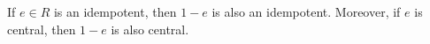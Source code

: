 If $e \in R$ is an idempotent, then $1 - e$ is also an idempotent. Moreover, if $e$ is central, then $1 - e$ is also central.
